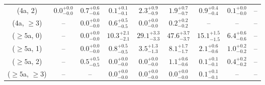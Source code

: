\begin{table}[h!]
{\begin{tabular}{ccccccccc}
	(4a, 2) & $0.0^{+ 0.0 }_{- 0.0 }$ & $0.7^{+ 0.6 }_{- 0.6 }$ & $0.1^{+ 0.1 }_{- 0.1 }$ & $2.3^{+ 0.9 }_{- 0.9 }$ & $1.9^{+ 0.7 }_{- 0.7 }$ & $0.9^{+ 0.4 }_{- 0.4 }$ & $0.1^{+ 0.0 }_{- 0.0 }$ & -- \\[0.5ex] 
	(4a, $\ge3$) & -- & $0.0^{+ 0.0 }_{- 0.0 }$ & $0.6^{+ 0.5 }_{- 0.5 }$ & $0.0^{+ 0.0 }_{- 0.0 }$ & $0.2^{+ 0.2 }_{- 0.2 }$ & -- & -- & -- \\[0.5ex] 
	($\ge5$a, 0) & -- & $0.0^{+ 0.0 }_{- 0.0 }$ & $10.3^{+ 2.1 }_{- 2.1 }$ & $29.1^{+ 3.3 }_{- 3.3 }$ & $47.6^{+ 3.7 }_{- 3.7 }$ & $15.1^{+ 1.5 }_{- 1.5 }$ & $6.4^{+ 0.6 }_{- 0.6 }$ & -- \\[0.5ex] 
	($\ge5$a, 1) & -- & $0.0^{+ 0.0 }_{- 0.0 }$ & $0.8^{+ 0.5 }_{- 0.5 }$ & $3.5^{+ 1.3 }_{- 1.3 }$ & $8.1^{+ 1.7 }_{- 1.7 }$ & $2.1^{+ 0.6 }_{- 0.6 }$ & $1.0^{+ 0.2 }_{- 0.2 }$ & -- \\[0.5ex] 
	($\ge5$a, 2) & -- & $0.5^{+ 0.5 }_{- 0.5 }$ & $0.0^{+ 0.0 }_{- 0.0 }$ & $0.0^{+ 0.0 }_{- 0.0 }$ & $1.1^{+ 0.6 }_{- 0.6 }$ & $0.1^{+ 0.1 }_{- 0.1 }$ & $0.4^{+ 0.2 }_{- 0.2 }$ & -- \\[0.5ex] 
	($\ge5$a, $\ge3$) & -- & -- & $0.0^{+ 0.0 }_{- 0.0 }$ & $0.0^{+ 0.0 }_{- 0.0 }$ & $0.0^{+ 0.0 }_{- 0.0 }$ & $0.1^{+ 0.1 }_{- 0.1 }$ & -- & -- \\[0.5ex] 
	\hline
	\hline
\end{tabular}}
\end{table}
